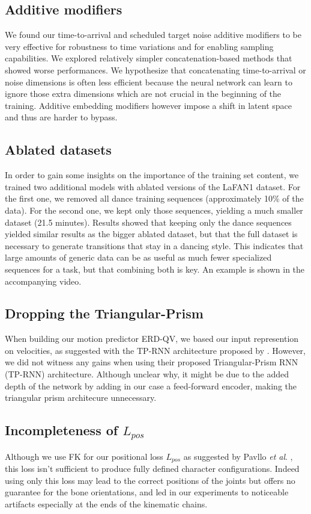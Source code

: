 \documentclass[acmtog]{acmart}
\newcommand{\etal}{\textit{et al}. }
\begin{document}
\subsection{Additive modifiers}
We found our time-to-arrival and scheduled target noise additive modifiers to be very effective for robustness to time variations and for enabling sampling capabilities. We explored relatively simpler concatenation-based methods that showed worse performances. We hypothesize that concatenating time-to-arrival or noise dimensions is often less efficient because the neural network can learn to ignore those extra dimensions which are not crucial in the beginning of the training. Additive embedding modifiers however impose a shift in latent space and thus are harder to bypass.  
\subsection{Ablated datasets}
In order to gain some insights on the importance of the training set content, we trained two additional models with ablated versions of the LaFAN1 dataset. For the first one, we removed all dance training sequences (approximately 10\% of the data). For the second one, we kept only those sequences, yielding a much smaller dataset (21.5 minutes). Results showed that keeping only the dance sequences yielded similar results as the bigger ablated dataset, but that the full dataset is necessary to generate transitions that stay in a dancing style. This indicates that large amounts of generic data can be as useful as much fewer specialized sequences for a task, but that combining both is key. An example is shown in the accompanying video.

\subsection{Dropping the Triangular-Prism}
When building our motion predictor ERD-QV, we based our input represention on velocities, as suggested with the TP-RNN architecture proposed by \cite{chiu2019action}. However, we did not witness any gains when using their proposed Triangular-Prism RNN (TP-RNN) architecture. Although unclear why, it might be due to the added depth of the network by adding in our case a feed-forward encoder, making the triangular prism architecure unnecessary.

\subsection{Incompleteness of $L_{\mathit{pos}}$}
Although we use FK for our positional loss $L_{\mathit{pos}}$ as suggested by Pavllo \etal {}, this loss isn't sufficient to produce fully defined character configurations. Indeed using only this loss may lead to the correct positions of the joints but offers no guarantee for the bone orientations, and led in our experiments to noticeable artifacts especially at the ends of the kinematic chains.
\end{document}
